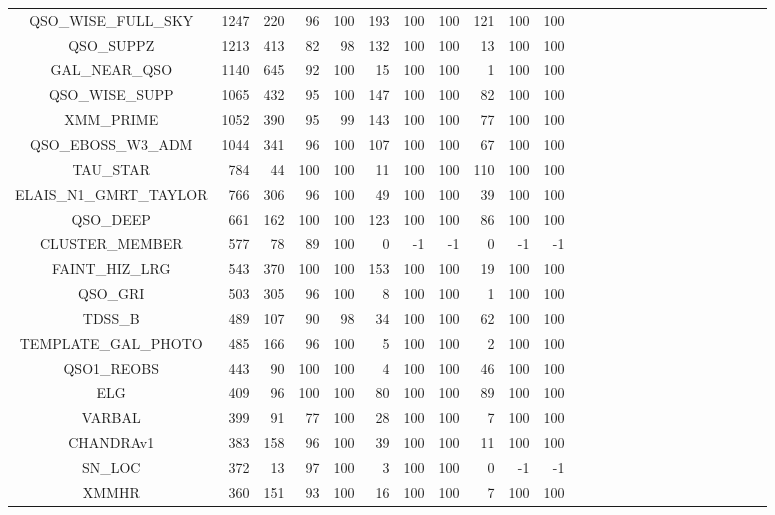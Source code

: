 \documentclass[onecolumn]{aa}
\begin{document}
\begin{center}
\begin{longtable}{c r rrrr rrrr rrrrr rrrrr rrrrr}
QSO\_WISE\_FULL\_SKY     & 1247   & 220    & 96  & 100 & 193   & 100 & 100  & 121 & 100 & 100 \\ 
QSO\_SUPPZ               & 1213   & 413    & 82  & 98  & 132   & 100 & 100  & 13 & 100 & 100 \\ 
GAL\_NEAR\_QSO           & 1140   & 645    & 92  & 100 & 15    & 100 & 100  & 1  & 100 & 100 \\ 
QSO\_WISE\_SUPP          & 1065   & 432    & 95  & 100 & 147   & 100 & 100  & 82 & 100 & 100 \\ 
XMM\_PRIME               & 1052   & 390    & 95  & 99  & 143   & 100 & 100  & 77 & 100 & 100 \\ 
QSO\_EBOSS\_W3\_ADM      & 1044   & 341    & 96  & 100 & 107   & 100 & 100  & 67 & 100 & 100 \\ 
TAU\_STAR                & 784    & 44     & 100 & 100 & 11    & 100 & 100  & 110 & 100 & 100 \\ 
ELAIS\_N1\_GMRT\_TAYLOR  & 766    & 306    & 96  & 100 & 49    & 100 & 100  & 39 & 100 & 100 \\ 
QSO\_DEEP                & 661    & 162    & 100 & 100 & 123   & 100 & 100  & 86 & 100 & 100 \\ 
CLUSTER\_MEMBER          & 577    & 78     & 89  & 100 & 0     & -1  & -1   & 0 & -1  & -1 \\ 
FAINT\_HIZ\_LRG          & 543    & 370    & 100 & 100 & 153   & 100 & 100  & 19 & 100 & 100 \\ 
QSO\_GRI                 & 503    & 305    & 96  & 100 & 8     & 100 & 100  & 1  & 100 & 100 \\ 
TDSS\_B                  & 489    & 107    & 90  & 98  & 34    & 100 & 100  & 62 & 100 & 100 \\ 
TEMPLATE\_GAL\_PHOTO     & 485    & 166    & 96  & 100 & 5     & 100 & 100  & 2 & 100 & 100 \\ 
QSO1\_REOBS              & 443    & 90     & 100 & 100 & 4     & 100 & 100  & 46 & 100 & 100 \\ 
ELG                      & 409    & 96     & 100 & 100 & 80    & 100 & 100  & 89 & 100 & 100 \\ 
VARBAL                   & 399    & 91     & 77  & 100 & 28    & 100 & 100  & 7 & 100 & 100 \\ 
CHANDRAv1                & 383    & 158    & 96  & 100 & 39    & 100 & 100  & 11 & 100 & 100 \\ 
SN\_LOC                  & 372    & 13     & 97  & 100 & 3     & 100 & 100  & 0 & -1  & -1 \\ 
XMMHR                    & 360    & 151    & 93  & 100 & 16    & 100 & 100  & 7 & 100 & 100 \\ 

\end{longtable}
\end{center}
\end{document}
